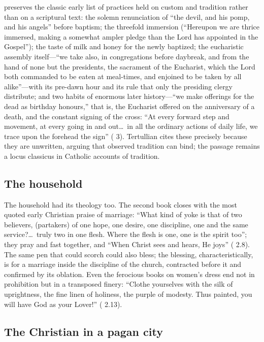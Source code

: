  preserves the classic early list of practices held on custom
and tradition rather than on a scriptural text: the solemn renunciation of
``the devil, and his pomp, and his angels'' before baptism; the threefold
immersion (``Hereupon we are thrice immersed, making a somewhat ampler pledge
than the Lord has appointed in the Gospel''); the taste of milk and honey for
the newly baptized; the eucharistic assembly itself---``we take also, in
congregations before daybreak, and from the hand of none but the presidents,
the sacrament of the Eucharist, which the Lord both commanded to be eaten at
meal-times, and enjoined to be taken by all alike''---with its pre-dawn hour
and its rule that only the presiding clergy distribute; and two habits
of enormous later history---``we make offerings for the dead as birthday
honours,'' that is, the Eucharist offered on the anniversary of a death, and
the constant signing of the cross: ``At every forward step and movement, at
every going in and out\ldots\ in all the ordinary actions of daily life, we
trace upon the forehead the sign'' ( 3). Tertullian cites
these precisely because they are unwritten, arguing that observed tradition can
bind; the passage remains a locus classicus in Catholic accounts of tradition.

\subsection{The household}

The household had its theology too. The second book  closes
with the most quoted early Christian praise of marriage: ``What kind of yoke is
that of two believers, (partakers) of one hope, one desire, one discipline, one
and the same service?\ldots\ truly two in one flesh. Where the flesh is one,
one is the spirit too''; they pray and fast together, and ``When Christ sees
and hears, He joys'' ( 2.8). The same pen that could scorch
could also bless; the blessing, characteristically, is for a marriage inside
the discipline of the church, contracted before it and confirmed by its
oblation. Even the ferocious books on women's dress end not in prohibition but
in a transposed finery: ``Clothe yourselves with the silk of uprightness, the
fine linen of holiness, the purple of modesty. Thus painted, you will have God
as your Lover!'' ( 2.13).

\subsection{The Christian in a pagan city}

